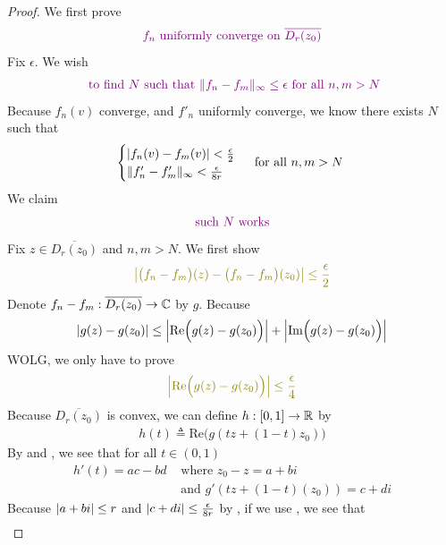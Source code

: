 \documentclass{report}
\begin{document}
\begin{proof}
We first prove 
\begin{align}
\label{fnun}
\textcolor{violet}{f_n\text{ uniformly converge on $\overline{D_r(z_0)}$}}
\end{align}
Fix $\epsilon $. We wish  
\begin{align*}
  \textcolor{violet}{\text{ to find $N$ such that $\| f_n-f_m \|_\infty \leq \epsilon $ for all $n,m>N$}}
\end{align*}
Because $f_n(v)$ converge, and $f'_n$ uniformly converge, we know there exists $N$ such that 
 \begin{align}
\label{UCD3}
\begin{cases}
 \left|f_n(v)-f_m(v)\right|<\frac{\epsilon}{2} \\
\| f_n'-f_m' \|_\infty <\frac{\epsilon }{8r}
\end{cases}\text{ for all $n,m>N$ }
\end{align}
We claim 
\begin{align*}
\textcolor{violet}{\text{ such $N$ works }}
\end{align*}
Fix $z \in \overline{D_r(z_0)}$ and $n,m>N$. We first show
\begin{align*}
\olive{\abso{\big(f_n-f_m\big)(z)-\big(f_n-f_m \big)(z_0)}\leq \frac{\epsilon}{2}}
\end{align*}
Denote $f_n-f_m:\overline{D_r(z_0)}\rightarrow \mathbb{C}$ by $g$. Because 
\begin{align*}
\left|g(z)-g(z_0)\right|\leq \left|\text{Re}\Big(g(z)-g(z_0) \Big)\right|+ \left|\text{Im}\Big(g(z)-g(z_0)\Big)\right|
\end{align*}
WOLG, we only have to prove 
\begin{align*}
\olive{\abso{\text{Re}\Big(g(z)-g(z_0) \Big)}\leq \frac{\epsilon}{4}}
\end{align*}
Because $\overline{D_r(z_0)}$ is convex, we can define $h:[0,1]\rightarrow \mathbb{R}$ by
\begin{align*}
h(t)\triangleq \text{Re}\Big(g(tz+(1-t)z_0) \Big)
\end{align*}
By  and , we see that for all $t\in (0,1)$ 
\begin{align*}
  h'(t)= ac-bd&\text{ where }z_0-z=a+b i \\
&\text{ and } g'(tz+(1-t)(z_0))=c+di
\end{align*}
Because $\left|a+b i\right|\leq r$ and $\left|c+di\right|\leq \frac{\epsilon}{8r}$ by  , if we use  , we see that 
\begin{align*}

\end{align*}
\end{proof}
\end{document}

